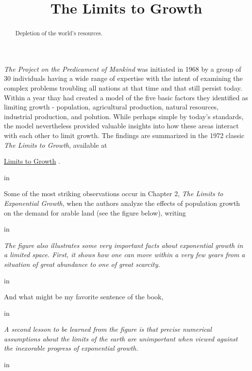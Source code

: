 \documentclass{ximera}
\title{The Limits to Growth}
\newcommand{\pskip}{\vskip 0.1 in}
\begin{document}
\begin{abstract}
Depletion of the world's resources.
\end{abstract}
\maketitle


\emph{The Project on the Predicament of Mankind} was initiated in 1968 by a group of 30 individuals having a wide range of expertise with the intent of examining the complex problems troubling all nations at that time and that still persist today. Within a year thay had created a model of the five basic factors they identified as limiting growth  - population, agricultural production, natural resources, industrial production, and polution. While perhaps simple by today's standards, the model nevertheless provided valuable insights into how these areas interact with each other to limit growth. The findings are summarized in the 1972 classic \emph{The Limits to Growth}, available at

\href{https://www.library.dartmouth.edu/digital/digital-collections/limits-growth}{Limits to Growth} .


\pskip

Some of the most striking observations occur in Chapter 2, \emph{The Limits to Exponential Growth}, when the authors analyze the effects of population growth on the demand for arable land (see the figure below), writing 

\pskip

\emph{The figure also illustrates some very important facts about exponential growth in a limited space. First, it shows how one can move within a very few years from a situation of great abundance to one of great scarcity.}  

\pskip

And what might be my favorite sentence of the book, 

\pskip

\emph{A second lesson to be learned from the figure is that precise numerical assumptions about the limits of the earth are unimportant when viewed against the inexorable progress of exponential growth.}

\pskip

 
\end{document}
